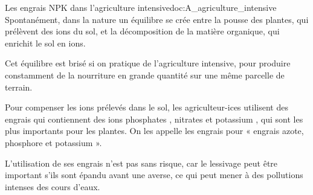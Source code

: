 \begin{doc}{Les engrais NPK dans l'agriculture intensive}{doc:A_agriculture_intensive}
  Spontanément, dans la nature un équilibre se crée entre la pousse des plantes, qui prélèvent des ions du sol, et la décomposition de la matière organique, qui enrichit le sol en ions.

  Cet équilibre est brisé si on pratique de l'agriculture intensive, pour produire constamment de la nourriture en grande quantité sur une même parcelle de terrain. 
  \begin{importants}
    Pour compenser les ions prélevés dans le sol, les agriculteur-ices utilisent des engrais qui contiennent des ions phosphates \ionPhosphate, nitrates \nitrate et potassium \ionPotassium, qui sont les plus importants pour les plantes.
    On les appelle les engrais  pour « engrais azote, phosphore et potassium ».
  \end{importants}
  
  L'utilisation de ses engrais n'est pas sans risque, car le lessivage peut être important s'ils sont épandu avant une averse, ce qui peut mener à des pollutions intenses des cours d'eaux.

  
  


\end{doc}
